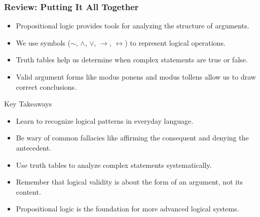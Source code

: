 \documentclass{beamer}
\begin{document}
                                    \begin{frame}
                                    \frametitle{Review: Putting It All Together}
                                    \begin{itemize}
                                        \item Propositional logic provides tools for analyzing the structure of arguments.
                                        \item We use symbols ($\sim$, $\wedge$, $\vee$, $\rightarrow$, $\leftrightarrow$) to represent logical operations.
                                        \item Truth tables help us determine when complex statements are true or false.
                                        \item Valid argument forms like modus ponens and modus tollens allow us to draw correct conclusions.
                                    \end{itemize}
                                    
                                    \begin{alertblock}{Key Takeaways}
                                        \scriptsize
                                    \begin{itemize}
                                        \item Learn to recognize logical patterns in everyday language.
                                        \item Be wary of common fallacies like affirming the consequent and denying the antecedent.
                                        \item Use truth tables to analyze complex statements systematically.
                                        \item Remember that logical validity is about the form of an argument, not its content.
                                        \item Propositional logic is the foundation for more advanced logical systems.
                                    \end{itemize}
                                    \end{alertblock}
                                    \end{frame}
\end{document}
